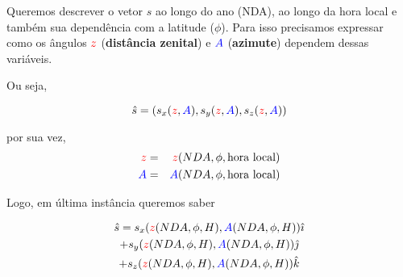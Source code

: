 \documentclass[12pt,a4paper]{article}
\begin{document}
	Queremos descrever o vetor $\hat{s}$ ao longo do ano (NDA), ao longo da
	hora local e também sua dependência com a latitude ($\phi$). Para isso
	precisamos expressar como os ângulos $\color{red}{z}$ ({\bf distância zenital}) e
	$\color{blue}{A}$ ({\bf azimute}) dependem dessas variáveis.

	Ou seja,

	\begin{equation}
		\hat{s} = (s_x({\color{red}{z}},{\color{blue}{A}}),s_y({\color{red}{z}},{\color{blue}{A}}),s_z({\color{red}{z}},{\color{blue}{A}}))
	\end{equation}

	por sua vez,
	\begin{eqnarray}
		{\color{red}{z}}&=&{\color{red}{z}}(NDA,\phi,\text{hora local})\\
		{\color{blue}{A}}&=&{\color{blue}{A}}(NDA,\phi,\text{hora local})
	\end{eqnarray}

	Logo, em última instância queremos saber

	\begin{multline}
		\hat{s} = s_x({\color{red}{z}}(NDA,\phi,H),{\color{blue}{A}}(NDA,\phi,H))\hat{\imath} \\
		+ s_y({\color{red}{z}}(NDA,\phi,H),{\color{blue}{A}}(NDA,\phi,H))\hat{\jmath} \\
		+ s_z({\color{red}{z}}(NDA,\phi,H),{\color{blue}{A}}(NDA,\phi,H))\hat{k}
	\end{multline}

	
\end{document}
